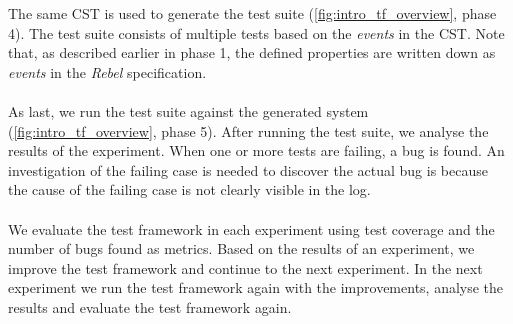 The same CST is used to generate the test suite
(\autoref{fig:intro_tf_overview}, phase 4). The test suite consists of multiple
tests based on the \textit{events} in the CST. Note that, as described earlier in phase 1,
the defined properties are written down as \textit{events} in the
\textit{Rebel} specification.\\
\\
As last, we run the test suite against the generated system (\autoref{fig:intro_tf_overview}, phase 5). After running the test suite, we analyse the results of the experiment. When one or more tests are failing, a bug is found. An
investigation of the failing case is needed to discover the actual bug is because the cause of the failing case is not clearly visible in the log.\\
\\
We evaluate the test framework in each experiment using test coverage and the number of bugs found as metrics. Based on the results of an experiment, we improve the test framework and continue to the next experiment. In the next experiment we run the test framework again with the improvements, analyse the results and evaluate the test framework again.


